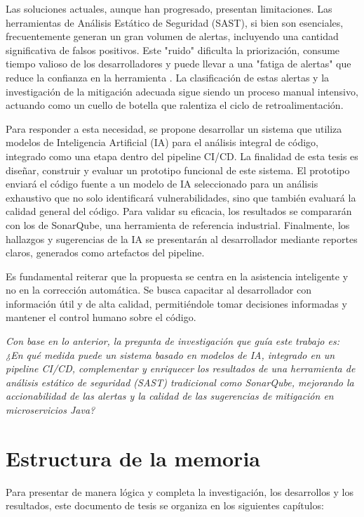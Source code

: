 Las soluciones actuales, aunque han progresado, presentan limitaciones. Las herramientas de Análisis Estático de Seguridad (SAST), si bien son esenciales, frecuentemente generan un gran volumen de alertas, incluyendo una cantidad significativa de falsos positivos. Este "ruido" dificulta la priorización, consume tiempo valioso de los desarrolladores y puede llevar a una "fatiga de alertas" que reduce la confianza en la herramienta \cite{Johnson2023UsabilitySAST}. La clasificación de estas alertas y la investigación de la mitigación adecuada sigue siendo un proceso manual intensivo, actuando como un cuello de botella que ralentiza el ciclo de retroalimentación.

Para responder a esta necesidad, se propone desarrollar un sistema que utiliza modelos de Inteligencia Artificial (IA) para el análisis integral de código, integrado como una etapa dentro del pipeline CI/CD. La finalidad de esta tesis es diseñar, construir y evaluar un prototipo funcional de este sistema. El prototipo enviará el código fuente a un modelo de IA seleccionado para un análisis exhaustivo que no solo identificará vulnerabilidades, sino que también evaluará la calidad general del código. Para validar su eficacia, los resultados se compararán con los de SonarQube, una herramienta de referencia industrial. Finalmente, los hallazgos y sugerencias de la IA se presentarán al desarrollador mediante reportes claros, generados como artefactos del pipeline.

Es fundamental reiterar que la propuesta se centra en la asistencia inteligente y no en la corrección automática. Se busca capacitar al desarrollador con información útil y de alta calidad, permitiéndole tomar decisiones informadas y mantener el control humano sobre el código.

\textit{Con base en lo anterior, la pregunta de investigación que guía este trabajo es: ¿En qué medida puede un sistema basado en modelos de IA, integrado en un pipeline CI/CD, complementar y enriquecer los resultados de una herramienta de análisis estático de seguridad (SAST) tradicional como SonarQube, mejorando la accionabilidad de las alertas y la calidad de las sugerencias de mitigación en microservicios Java?}

\section{Estructura de la memoria}\label{sec:estructura}

Para presentar de manera lógica y completa la investigación, los desarrollos y los resultados, este documento de tesis se organiza en los siguientes capítulos:

